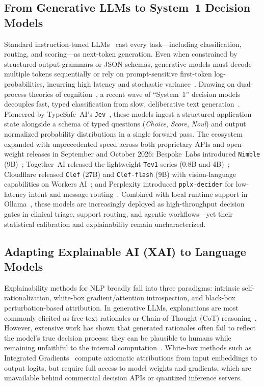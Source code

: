 \documentclass[10pt]{article}
\begin{document}
\subsection{From Generative LLMs to System~1 Decision Models}
Standard instruction-tuned LLMs~\cite{achiam2023gpt4,dubey2024llama3,yang2024qwen2} cast every task---including classification, routing, and scoring---as next-token generation.
Even when constrained by structured-output grammars or JSON schemas, generative models must decode multiple tokens sequentially or rely on prompt-sensitive first-token log-probabilities, incurring high latency and stochastic variance~\cite{atil2025nondeterminism}.
Drawing on dual-process theories of cognition~\cite{kahneman2011thinking}, a recent wave of ``System~1'' decision models decouples fast, typed classification from slow, deliberative text generation~\cite{typesafe2026jev,systemone2026api}.
Pioneered by TypeSafe~AI's \texttt{Jev}~\cite{typesafe2026jev}, these models ingest a structured application state alongside a schema of typed questions (\emph{Choice}, \emph{Score}, \emph{Noul}) and output normalized probability distributions in a single forward pass.
The ecosystem expanded with unprecedented speed across both proprietary APIs and open-weight releases in September and October 2026: Bespoke~Labs introduced \texttt{Nimble} (9B)~\cite{bespoke2026nimble}; Together~AI released the lightweight \texttt{Tev1} series (0.8B and 4B)~\cite{ollama2026tev1}; Cloudflare released \texttt{Clef} (27B) and \texttt{Clef-flash} (9B) with vision-language capabilities on Workers AI~\cite{cloudflare2026clef}; and Perplexity introduced \texttt{pplx-decider} for low-latency intent and message routing~\cite{perplexity2026decider}.
Combined with local runtime support in Ollama~\cite{ollama2026decision}, these models are increasingly deployed as high-throughput decision gates in clinical triage, support routing, and agentic workflows---yet their statistical calibration and explainability remain uncharacterized.

\subsection{Adapting Explainable AI (XAI) to Language Models}
Explainability methods for NLP broadly fall into three paradigms: intrinsic self-rationalization, white-box gradient/attention introspection, and black-box perturbation-based attribution.
In generative LLMs, explanations are most commonly elicited as free-text rationales or Chain-of-Thought (CoT) reasoning~\cite{camburu2018,wei2022cot}.
However, extensive work has shown that generated rationales often fail to reflect the model's true decision process: they can be plausible to humans while remaining unfaithful to the internal computation~\cite{jacovi2020,wiegreffe2021,turpin2023language,lanham2023}.
White-box methods such as Integrated Gradients~\cite{sundararajan2017} compute axiomatic attributions from input embeddings to output logits, but require full access to model weights and gradients, which are unavailable behind commercial decision APIs or quantized inference servers.
\end{document}
